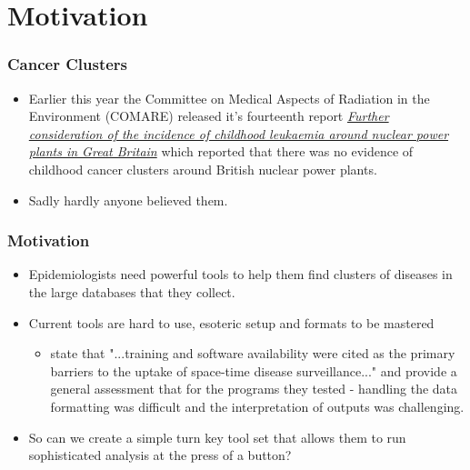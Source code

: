 \documentclass{beamer}
\begin{document}
\section{Motivation}
\begin{frame}[t]
\frametitle{Cancer Clusters}
\begin{itemize}
\item Earlier this year the Committee on Medical Aspects of Radiation in the Environment
(COMARE) released it's fourteenth report \href{http://www.comare.org.uk/press_releases/documents/COMARE14report.pdf}{\textit{
Further consideration of the incidence of childhood leukaemia around
nuclear power plants in Great Britain}} which reported that there was no evidence of childhood cancer clusters around British nuclear power plants.
\item Sadly hardly anyone believed them.
\end{itemize}
\end{frame}
\begin{frame}[t]
\frametitle{Motivation}

\begin{itemize}
\item Epidemiologists need powerful tools to help them find clusters of diseases in the large databases that they collect.
\item Current tools are hard to use, esoteric setup and formats to be mastered
\begin{itemize}
\item \citet{citeulike:6854836} state that "...training and software availability were cited as the primary barriers to the uptake of space-time disease surveillance..." and provide a general assessment that for the programs they tested - handling the data formatting was difficult and the interpretation of outputs was challenging.
\end{itemize}
\item So can we create a simple turn key tool set that allows them to run sophisticated analysis at the press of a button?
\end{itemize}
\end{frame}
\end{document}
